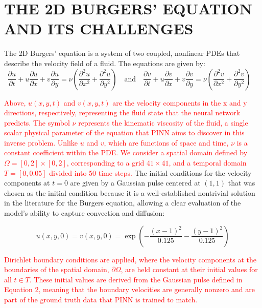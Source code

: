 \documentclass[12pt,fleqn]{article}
\begin{document}
\section{THE 2D BURGERS' EQUATION AND ITS CHALLENGES}

The 2D Burgers' equation is a system of two coupled, nonlinear PDEs that describe the velocity field of a fluid. The equations are given by:
\begin{equation}
    \frac{\partial u}{\partial t} + u \frac{\partial u}{\partial x} + v \frac{\partial u}{\partial y} = \nu \left( \frac{\partial^2 u}{\partial x^2} + \frac{\partial^2 u}{\partial y^2} \right) \quad  \text{and} \quad
    \frac{\partial v}{\partial t} + u \frac{\partial v}{\partial x} + v \frac{\partial v}{\partial y} = \nu \left( \frac{\partial^2 v}{\partial x^2} + \frac{\partial^2 v}{\partial y^2} \right) \quad
\end{equation}

\textcolor{red}{\noindent Above, $u(x, y, t)$ and $v(x, y, t)$ are the velocity components in the x and y directions, respectively, representing the fluid state that the neural network predicts. The symbol $\nu$ represents the kinematic viscosity of the fluid, a single scalar physical parameter of the equation that PINN aims to discover in this inverse problem. Unlike $u$ and $v$, which are functions of space and time, $\nu$ is a constant coefficient within the PDE. We consider a spatial domain defined by $\Omega = [0, 2] \times [0, 2]$, corresponding to a grid $41 \times 41$, and a temporal domain $T = [0, 0.05]$ divided into 50 time steps.}
The initial conditions for the velocity components at $t=0$ are given by a Gaussian pulse centered at $(1,1)$ that was chosen as the initial condition because it is a well-established nontrivial solution in the literature for the Burgers equation, allowing a clear evaluation of the model's ability to capture convection and diffusion: 

\begin{equation}
    u(x, y, 0) = v(x, y, 0) = \exp\left(-\frac{(x - 1)^2}{0.125} - \frac{(y - 1)^2}{0.125}\right)
\end{equation}

\textcolor{red}{\noindent Dirichlet boundary conditions are applied, where the velocity components at the boundaries of the spatial domain, $\partial\Omega$, are held constant at their initial values for all $t \in T$. These initial values are derived from the Gaussian pulse defined in Equation 2, meaning that the boundary velocities are generally nonzero and are part of the ground truth data that PINN is trained to match.}
\end{document}
